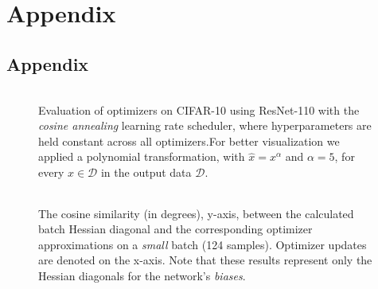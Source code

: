 \chapter{Appendix}


\section{Appendix}
\begin{figure}[h!]
    \centering
    \begin{tabular}{cc}
         \\ 
        
    \end{tabular}
    \caption{Evaluation of optimizers on CIFAR-10 using ResNet-110 with the \emph{cosine annealing} learning rate scheduler, where hyperparameters
    are held constant across all optimizers.For better visualization we applied a polynomial transformation, with $\hat{x}=x^\alpha$ and $\alpha=5$, for every $x \in \mathcal{D}$ in the output data $ \mathcal{D}$.}
    \label{fig:cifar-10-cosine-real}
\end{figure}

\begin{figure}[h!]
    \centering
    \begin{tabular}{cc}
         \\ %
    \end{tabular}
    \caption{The cosine similarity (in degrees), y-axis, between the calculated batch Hessian diagonal and the corresponding optimizer approximations on a \emph{small} batch (124 samples).
    Optimizer updates are denoted on the x-axis.
    Note that these results represent only the Hessian diagonals for the network's \emph{biases}.}
    \label{fig:cosine-bias-small-batch}
\end{figure}

